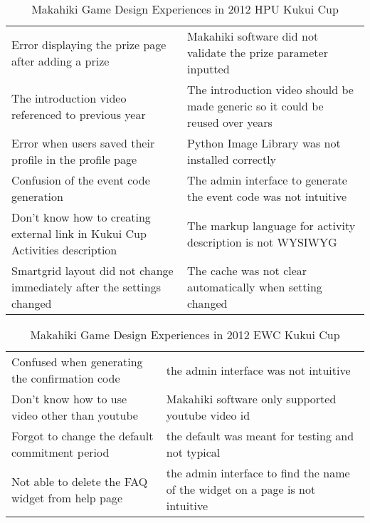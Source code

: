 \begin{table}[ht!]
  \centering
  \begin{tabular}{|P{0.5\columnwidth}|P{0.4\columnwidth}|}
    \hline
    \centering {} &   \\
    \hline
    Error displaying the prize page after adding a prize  & Makahiki software did not validate the prize parameter inputted \\
    \hline
    The introduction video referenced to previous year &  The introduction video should be made generic so it could be reused over years \\
    \hline
    Error when users saved their profile in the profile page & Python Image Library was not installed correctly\\
    \hline
    Confusion of the event code generation & The admin interface to generate the event code was not intuitive\\
    \hline
    Don't know how to creating external link in Kukui Cup Activities description & The markup language for activity description is not WYSIWYG \\
    \hline
    Smartgrid layout did not change immediately after the settings changed & The cache was not clear automatically when setting changed\\
    \hline
  \end{tabular}
  \caption{Makahiki Game Design Experiences in 2012 HPU Kukui Cup}
  \label{fig:hpu-design}
\end{table}

\begin{table}[ht!]
  \centering
  \begin{tabular}{|P{0.5\columnwidth}|P{0.4\columnwidth}|}
    \hline
    \centering {} &  \\
    \hline
    Confused when generating the confirmation code  & the admin interface was not intuitive \\
    \hline
    Don't know how to use video other than youtube &  Makahiki software only supported youtube video id \\
    \hline
    Forgot to change the default commitment period & the default was meant for testing and not typical\\
    \hline
    Not able to delete the FAQ widget from help page & the admin interface to find the name of the widget on a page is not intuitive \\
    \hline
  \end{tabular}
  \caption{Makahiki Game Design Experiences in 2012 EWC Kukui Cup}
  \label{fig:ewc-design}
\end{table}

